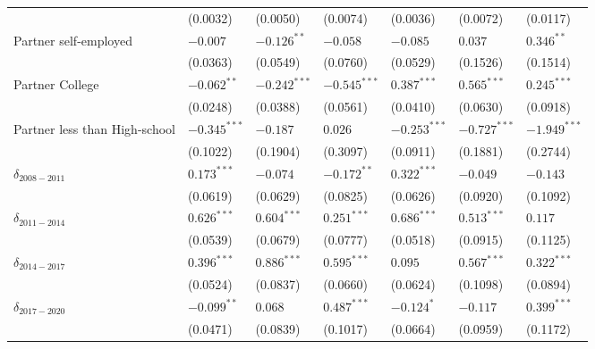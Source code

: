 \begin{tabular}{lllllll}
                              &        (0.0032) &        (0.0050) &        (0.0074) &        (0.0036) &        (0.0072) &        (0.0117) \\
Partner self-employed         &        $-0.007$ &   $-0.126^{**}$ &        $-0.058$ &        $-0.085$ &         $0.037$ &    $0.346^{**}$ \\
                              &        (0.0363) &        (0.0549) &        (0.0760) &        (0.0529) &        (0.1526) &        (0.1514) \\
Partner College               &   $-0.062^{**}$ &  $-0.242^{***}$ &  $-0.545^{***}$ &   $0.387^{***}$ &   $0.565^{***}$ &   $0.245^{***}$ \\
                              &        (0.0248) &        (0.0388) &        (0.0561) &        (0.0410) &        (0.0630) &        (0.0918) \\
Partner less than High-school &  $-0.345^{***}$ &        $-0.187$ &         $0.026$ &  $-0.253^{***}$ &  $-0.727^{***}$ &  $-1.949^{***}$ \\
                              &        (0.1022) &        (0.1904) &        (0.3097) &        (0.0911) &        (0.1881) &        (0.2744) \\
$\delta_{2008-2011}$          &   $0.173^{***}$ &        $-0.074$ &   $-0.172^{**}$ &   $0.322^{***}$ &        $-0.049$ &        $-0.143$ \\
                              &        (0.0619) &        (0.0629) &        (0.0825) &        (0.0626) &        (0.0920) &        (0.1092) \\
$\delta_{2011-2014}$          &   $0.626^{***}$ &   $0.604^{***}$ &   $0.251^{***}$ &   $0.686^{***}$ &   $0.513^{***}$ &         $0.117$ \\
                              &        (0.0539) &        (0.0679) &        (0.0777) &        (0.0518) &        (0.0915) &        (0.1125) \\
$\delta_{2014-2017}$          &   $0.396^{***}$ &   $0.886^{***}$ &   $0.595^{***}$ &         $0.095$ &   $0.567^{***}$ &   $0.322^{***}$ \\
                              &        (0.0524) &        (0.0837) &        (0.0660) &        (0.0624) &        (0.1098) &        (0.0894) \\
$\delta_{2017-2020}$          &   $-0.099^{**}$ &         $0.068$ &   $0.487^{***}$ &      $-0.124^*$ &        $-0.117$ &   $0.399^{***}$ \\
                              &        (0.0471) &        (0.0839) &        (0.1017) &        (0.0664) &        (0.0959) &        (0.1172) \\

\end{tabular}
